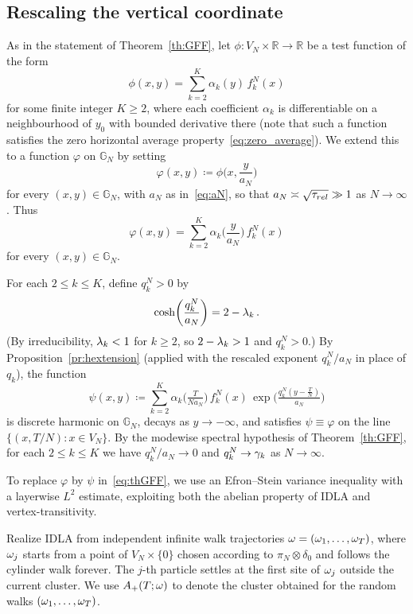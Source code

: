 \documentclass[11pt,a4paper,reqno]{amsart}
\theoremstyle{definition}
\newcommand{\bbG}{{\ensuremath{\mathbb G}} }
\newcommand{\bbR}{{\ensuremath{\mathbb R}} }
\let\a=\alpha \let\b=\beta   \let\d=\delta  \let\e=\varepsilon
\begin{document}
\subsection{Rescaling the vertical coordinate}


As in the statement of Theorem~\ref{th:GFF}, let $\phi : V_N \times \bbR \to \bbR$ be a test function of the form
	\[ \phi(x, y) = \sum_{k=2}^K \alpha_k(y)\, f_k^N(x) \]
for some finite integer $K \geq 2$, where each coefficient $\alpha_k$ is differentiable on a neighbourhood of $y_0$ with bounded derivative there (note that such a function satisfies the zero horizontal average property~\eqref{eq:zero_average}). We extend this to a function $\varphi$ on $\bbG_N$ by setting
	\[ \varphi(x, y) \coloneqq \phi\!\Big( x, \frac{y}{a_N} \Big) \]
for every $(x, y) \in \bbG_N$, with $a_N$ as in~\eqref{eq:aN}, so that $a_N \asymp \sqrt{\tau_{rel}} \gg 1$ as $N \to \infty$. Thus
	\[ \varphi(x, y) = \sum_{k=2}^K \a_k\!\Big( \frac{y}{a_N} \Big)\, f_k^N(x) \]
for every $(x, y) \in \bbG_N$.

For each $2 \leq k \leq K$, define $q_k^N > 0$ by
	\begin{equation}\label{def:qkN}
	 \cosh\!\left( \frac{q_k^N}{a_N} \right) = 2 - \lambda_k\,.
	 \end{equation}
(By irreducibility, $\lambda_k < 1$ for $k \geq 2$, so $2 - \lambda_k > 1$ and $q_k^N > 0$.)
By Proposition~\ref{pr:hextension} (applied with the rescaled exponent $q_k^N/a_N$ in place of $q_k$), the function
	\begin{equation}\label{eq:truepsi}
	 \psi(x, y) \coloneqq \sum_{k=2}^K \a_k\!\big( \tfrac{T}{Na_N} \big)\, f_k^N(x)\, 
	 \exp \Big( \tfrac{q_k^N (y- \tfrac{T}{N} ) }{a_N } \Big) 
	 \end{equation}
is discrete harmonic on $\bbG_N$, decays as $y \to -\infty$, and satisfies $\psi \equiv \varphi$ on the line $\{(x, T/N) : x \in V_N\}$. By the modewise spectral hypothesis of Theorem~\ref{th:GFF}, for each $2 \leq k \leq K$ we have $q_k^N / a_N \to 0$ and $q_k^N \to \gamma_k$ as $N \to \infty$.



To replace $\varphi$ by $\psi$ in~\eqref{eq:thGFF}, we use an Efron--Stein variance inequality with a layerwise $L^2$ estimate, exploiting both the abelian property of IDLA and vertex-transitivity.

Realize IDLA from independent infinite walk trajectories
$\omega = (\omega_1,\ldots,\omega_T)$,
where $\omega_j$ starts from a point of $V_N\times\{0\}$ chosen according to $\pi_N \otimes \d_0$
and follows the cylinder walk forever.
The $j$-th particle settles at the first site of $\omega_j$ outside the current cluster.
We use $A_+(T;\omega)$ to denote the cluster obtained for the random walks $(\omega_1,\ldots, \omega_T)$.
\end{document}
